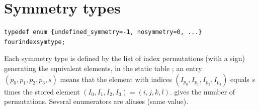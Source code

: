 \section{Symmetry types}\label{sec:fourindex:symmetry}

\begin{lstlisting}
typedef enum {undefined_symmetry=-1, nosymmetry=0, ...} fourindexsymtype;
\end{lstlisting}
Each symmetry type is defined by the list of index permutations (with a sign) generating the equivalent
elements, in the static table \allowbreak{}\allowbreak{};
an entry $(p_0,p_1,p_2,p_3,s)$ means that the element with indices $(I_{p_0},I_{p_1},I_{p_2},I_{p_3})$ equals $s$ times
the stored element $(I_0,I_1,I_2,I_3)=(i,j,k,l)$.  gives the number of
permutations. Several enumerators are aliases (same value).

